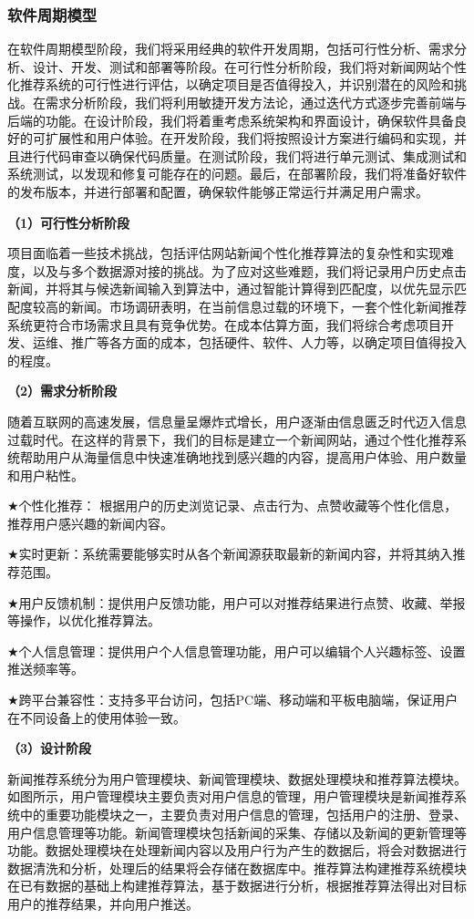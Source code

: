 \documentclass[withoutpreface,bwprint]{cumcmthesis} %
\begin{document}
	\subsubsection{ 软件周期模型}
	在软件周期模型阶段，我们将采用经典的软件开发周期，包括可行性分析、需求分析、设计、开发、测试和部署等阶段。在可行性分析阶段，我们将对新闻网站个性化推荐系统的可行性进行评估，以确定项目是否值得投入，并识别潜在的风险和挑战。在需求分析阶段，我们将利用敏捷开发方法论，通过迭代方式逐步完善前端与后端的功能。在设计阶段，我们将着重考虑系统架构和界面设计，确保软件具备良好的可扩展性和用户体验。在开发阶段，我们将按照设计方案进行编码和实现，并且进行代码审查以确保代码质量。在测试阶段，我们将进行单元测试、集成测试和系统测试，以发现和修复可能存在的问题。最后，在部署阶段，我们将准备好软件的发布版本，并进行部署和配置，确保软件能够正常运行并满足用户需求。\par
	\textbf{（1）可行性分析阶段}\par
	项目面临着一些技术挑战，包括评估网站新闻个性化推荐算法的复杂性和实现难度，以及与多个数据源对接的挑战。为了应对这些难题，我们将记录用户历史点击新闻，并将其与候选新闻输入到算法中，通过智能计算得到匹配度，以优先显示匹配度较高的新闻。市场调研表明，在当前信息过载的环境下，一套个性化新闻推荐系统更符合市场需求且具有竞争优势。在成本估算方面，我们将综合考虑项目开发、运维、推广等各方面的成本，包括硬件、软件、人力等，以确定项目值得投入的程度。
	\par
	\textbf{（2）需求分析阶段}\par
	随着互联网的高速发展，信息量呈爆炸式增长，用户逐渐由信息匮乏时代迈入信息过载时代。在这样的背景下，我们的目标是建立一个新闻网站，通过个性化推荐系统帮助用户从海量信息中快速准确地找到感兴趣的内容，提高用户体验、用户数量和用户粘性。\par
	$\bigstar$个性化推荐： 根据用户的历史浏览记录、点击行为、点赞收藏等个性化信息，推荐用户感兴趣的新闻内容。\par
	$\bigstar$实时更新：系统需要能够实时从各个新闻源获取最新的新闻内容，并将其纳入推荐范围。\par
	$\bigstar$用户反馈机制：提供用户反馈功能，用户可以对推荐结果进行点赞、收藏、举报等操作，以优化推荐算法。\par
	$\bigstar$个人信息管理：提供用户个人信息管理功能，用户可以编辑个人兴趣标签、设置推送频率等。\par
	$\bigstar$跨平台兼容性：支持多平台访问，包括PC端、移动端和平板电脑端，保证用户在不同设备上的使用体验一致。\par
	\textbf{（3）设计阶段}\par
	新闻推荐系统分为用户管理模块、新闻管理模块、数据处理模块和推荐算法模块。如图所示，用户管理模块主要负责对用户信息的管理，用户管理模块是新闻推荐系统中的重要功能模块之一，主要负责对用户信息的管理，包括用户的注册、登录、用户信息管理等功能。新闻管理模块包括新闻的采集、存储以及新闻的更新管理等功能。数据处理模块在处理新闻内容以及用户行为产生的数据后，将会对数据进行数据清洗和分析，处理后的结果将会存储在数据库中。推荐算法构建推荐系统模块在已有数据的基础上构建推荐算法，基于数据进行分析，根据推荐算法得出对目标用户的推荐结果，并向用户推送。\par
\end{document}
